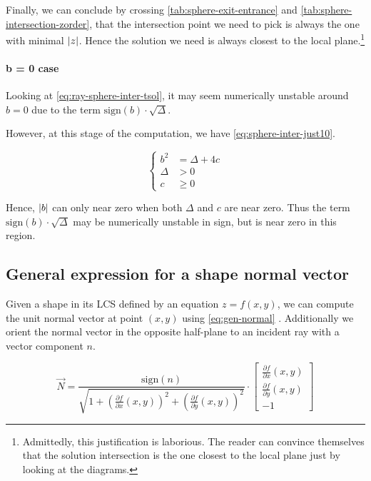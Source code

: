 Finally, we can conclude by crossing \cref{tab:sphere-exit-entrance}
and \cref{tab:sphere-intersection-zorder}, that the intersection point
we need to pick is always the one with minimal $\abs{z}$. Hence the
solution we need is always closest to the local plane.\footnote{Admittedly,
this justification is laborious. The reader can convince themselves
that the solution intersection is the one closest to the local plane just
by looking at the diagrams.}

\paragraph{b = 0 case}
Looking at \cref{eq:ray-sphere-inter-tsol}, it may seem numerically
unstable around $b = 0$ due to the term $\textrm{sign}(b) \cdot \sqrt{\Delta}$.

However, at this stage of the computation, we have
\cref{eq:sphere-inter-just10}.

\begin{equation} \label{eq:sphere-inter-just10} \begin{cases}
b^2 &= \Delta + 4 c \\
\Delta &> 0 \\
c &\geq 0
\end{cases} \end{equation}

Hence, $\abs{b}$ can only near zero when both $\Delta$ and $c$ are near zero.
Thus the term $\textrm{sign}(b) \cdot \sqrt{\Delta}$ may be numerically
unstable in sign, but is near zero in this region.

\subsection{General expression for a shape normal vector}
Given a shape in its \gls{LCS} defined by an equation $z = f(x, y)$,
we can compute the unit normal vector at point $(x, y)$ using
\cref{eq:gen-normal} \cite{mathworld:normal-vector}. Additionally
we orient the normal vector in the opposite half-plane to an incident
ray with a vector component $n$.

\begin{equation} \label{eq:gen-normal}
\overrightarrow{N} =
\frac{\textrm{sign}(n)}
     {\sqrt{1 + \left(\frac{\partial f}{\partial x}(x, y)\right)^2 +
                \left(\frac{\partial f}{\partial y}(x, y)\right)^2}}
\cdot
\begin{bmatrix}
\frac{\partial f}{\partial x}(x, y) \\
\frac{\partial f}{\partial y}(x, y) \\
-1
\end{bmatrix}
\end{equation}

